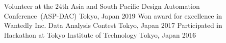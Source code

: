 
\begin{cvhonors}
  \cvact
    {Volunteer at the 24th Asia and South Pacific Design Automation Conference~(ASP-DAC)} %
    {} 
    {Tokyo, Japan} %
    {2019} %
  \cvact
    {Won award for excellence in Wantedly Inc. Data Analysis Contest} %
    {} 
    {Tokyo, Japan} %
    {2017} %
  \cvact
    {Participated in Hackathon at Tokyo Institute of Technology} %
    {} 
    {Tokyo, Japan} %
    {2016} %

\end{cvhonors}



